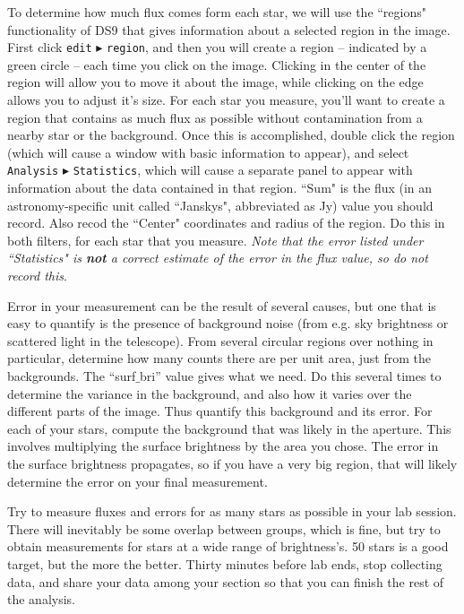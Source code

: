 To determine how much flux comes form each star, we will use the ``regions" functionality of DS9 that gives information about a selected region in the image. First click \texttt{edit} $\blacktriangleright$ \texttt{region}, and then you will create a region -- indicated by a green circle -- each time you click on the image. Clicking in the center of the region will allow you to move it about the image, while clicking on the edge allows you to adjust it's size. For each star you measure, you'll want to create a region that contains as much flux as possible without contamination from a nearby star or the background. Once this is accomplished, double click the region (which will cause a window with basic information to appear), and select \texttt{Analysis} $\blacktriangleright$ \texttt{Statistics}, which will cause a separate panel to appear with information about the data contained in that region. ``Sum" is the flux (in an astronomy-specific unit called ``Janskys", abbreviated as Jy) value you should record. Also recod the ``Center" coordinates and radius of the region. Do this in both filters, for each star that you measure. \textit{Note that the error listed under ``Statistics" is \textbf{not} a correct estimate of the error in the flux value, so do not record this}.

Error in your measurement can be the result of several causes, but one that is easy to quantify is the presence of background noise (from e.g. sky brightness or scattered light in the telescope). From several circular regions over nothing in particular, determine how many counts there are per unit area, just from the backgrounds.  The “surf$\_$bri” value gives what we need.  Do this several times to determine the variance in the background, and also how it varies over the different parts of the image.  Thus quantify this background and its error. For each of your stars, compute the background that was likely in the aperture.  This involves multiplying the surface brightness by the area you chose.  The error in the surface brightness propagates, so if you have a very big region, that will likely determine the error on your final measurement. 

Try to measure fluxes and errors for as many stars as possible in your lab session. There will inevitably be some overlap between groups, which is fine, but try to obtain measurements for stars at a wide range of brightness’s. 50 stars is a good target, but the more the better. Thirty minutes before lab ends, stop collecting data, and share your data among your section so that you can finish the rest of the analysis.

